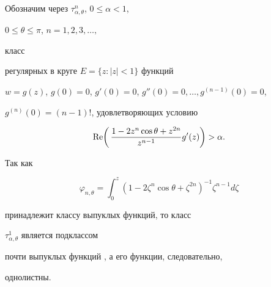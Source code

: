 \date{}







\pagestyle{plain} %













\maketitle













Обозначим через $\tau^n_{\alpha,\theta}$, $0\le\alpha<1$,


$0\le\theta\le\pi$, $n=1,2,3,\dotsc,$


класс


регулярных в круге $E=\{z:|z|<1\}$ функций


$w=g(z)$, $g(0)=0$, $g'(0)=0$, $g''(0)=0,\dotsc,g^{(n-1)}(0)=0$,


$g^{(n)}(0)=(n-1)!$, удовлетворяющих условию


\begin{equation}


\re\biggl(\,\frac{1-2z^n\cos\theta+z^{2n}}


{z^{n-1}}g'(z)\biggr)>\alpha.


\end{equation}


Так как


$$


\varphi_{n,\theta}=\int^z_0(1-2\zeta^n\cos\theta+\zeta^{2n})^{-1}


\zeta^{n-1}d\zeta


$$


принадлежит классу выпуклых функций, то класс


$\tau^1_{\alpha,\theta}$ является подклассом


почти выпуклых функций \cite{Kap}, а его функции, следовательно,


однолистны.





